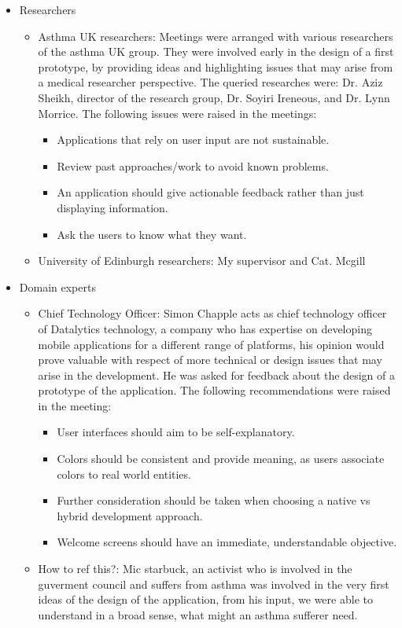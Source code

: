 \begin{itemize}



	\item Researchers 
    \begin{itemize}
      \item Asthma UK researchers: Meetings were arranged with various researchers of the asthma UK group. They were involved early in the design of a first prototype, by providing ideas and highlighting issues that may arise from a medical researcher perspective. The queried researches were:  Dr. Aziz Sheikh, director of the research group, Dr. Soyiri Ireneous, and Dr. Lynn Morrice.
    The following issues were raised in the meetings:
      \begin{itemize}
          \item Applications that rely on user input are not sustainable.
          \item Review past approaches/work to avoid known problems.
          \item An application should give actionable feedback rather than just displaying information.
          \item Ask the users to know what they want.
      \end{itemize}
      \item University of Edinburgh researchers: My supervisor and Cat. Mcgill

	\end{itemize}
    
	\item Domain experts    
   \begin{itemize}
      \item Chief Technology Officer: Simon Chapple acts as chief technology officer of Datalytics technology, a company who has expertise on developing mobile applications for a different range of platforms, his opinion would prove valuable with respect of more technical or design issues that may arise in the development. He was asked for feedback about the design of a prototype of the application.
    The following recommendations were raised in the meeting:
    \begin{itemize}
		\item User interfaces should aim to be self-explanatory. 
		\item Colors should be consistent and provide meaning, as users associate colors to real world entities.
		\item Further consideration should be taken when choosing a native vs hybrid development approach.
		\item Welcome screens should have an immediate, understandable objective.   
	\end{itemize}
	\item How to ref this?: Mic starbuck, an activist who is involved in the guverment council and suffers from asthma was involved in the very first ideas of the design of the application, from his input, we were able to understand in a broad sense, what might an asthma sufferer need.
	\end{itemize}


\end{itemize}

